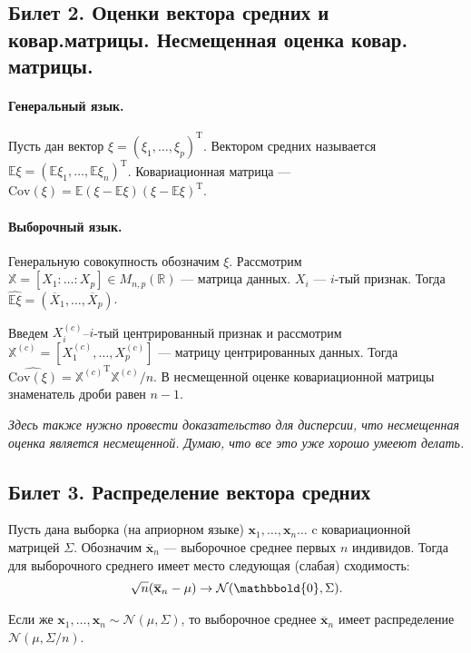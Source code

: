 \subsection{Билет 2. Оценки вектора средних и ковар.матрицы. Несмещенная оценка ковар. матрицы.}
\paragraph{Генеральный язык.}

Пусть дан вектор $\xi = (\xi_1, \ldots, \xi_p)^\mathrm T$. Вектором средних называется $\mathbb E\xi = (\mathbb E\xi_1, \ldots, \mathbb E\xi_n)^\mathrm T$.
Ковариационная матрица --- $\mathrm{Cov}(\xi) = \mathbb E(\xi-\mathbb E\xi)(\xi-\mathbb E\xi)^\mathrm T$.
\paragraph{Выборочный язык.}

Генеральную совокупность обозначим $\xi$.
Рассмотрим $\mathbb X = [X_1\colon\ldots\colon X_p] \in M_{n, p} (\mathbb R)$ --- матрица данных. $X_i$ --- $i$-тый признак. 
Тогда $\widehat{\mathbb E \xi} = \left(\overline X_1, \ldots, \overline X_p\right)$.

Введем $X_i^{(c)}$--$i$-тый центрированный признак и рассмотрим $\mathbb X^{(c)} = [X_1^{(c)}, \ldots, X_p^{(c)}]$ --- матрицу центрированных данных.
Тогда $\widehat{\mathrm {Cov}(\xi)} = {\mathbb X^{(c)}}^\mathrm T \mathbb X^{(c)} / n$. В несмещенной оценке ковариационной матрицы знаменатель дроби равен $n-1$.

\textit{Здесь также нужно провести доказательство для дисперсии, что несмещенная оценка является несмещенной. Думаю, что все это уже хорошо умееют делать.}

\subsection{Билет 3. Распределение вектора средних}
\begin{thm}
    Пусть дана выборка (на априорном языке) $\mathbf x_1, \ldots, \mathbf x_n \ldots$ c ковариационной матрицей $\Sigma$.
    Обозначим $\overline{\mathbf x}_n$ --- выборочное среднее первых $n$ индивидов.
    Тогда для выборочного среднего имеет место следующая (слабая) сходимость:
    \begin{gather*}
        \sqrt{n} (\overline{\mathbf{x}}_n - \mu) \to \mathcal N(\mathbbold{0}, \Sigma).
    \end{gather*}

    Если же $\mathbf x_1, \ldots, \mathbf x_n \sim \mathcal N(\mu, \Sigma)$, то выборочное среднее $\overline{\mathbf x}_n$ имеет распределение $\mathcal N(\mu, \Sigma/n)$.
\end{thm}

